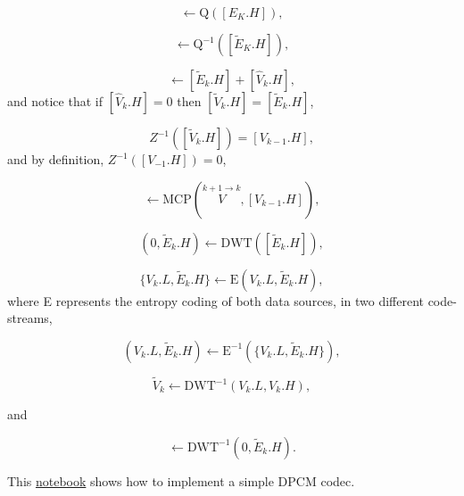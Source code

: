 \begin{equation}
  [\tilde{E}_k.H] \leftarrow \text{Q}([E_K.H]),
  \tag{j}
\end{equation}

\begin{equation}
  [\tilde{E}_k.H] \leftarrow  \text{Q}^{-1}([\tilde{E}_K.H]),
  \tag{k}
\end{equation}

\begin{equation}
  [\tilde{V}_k.H] \leftarrow [\tilde{E}_k.H] + [\hat{V}_k.H],
  \tag{l}
\end{equation}
and notice that if $[\hat{V}_k.H]=0$ then $[\tilde{V}_k.H] =
[\tilde{E}_k.H]$,

\begin{equation}
  Z^{-1}([\tilde{V}_k.H]) = [V_{k-1}.H],
  \tag{m}
\end{equation}
and by definition, $Z^{-1}([V_{-1}.H]) = 0$,

\begin{equation}
  [\hat{V}_k.H] \leftarrow \text{MCP}(\overset{k+1\rightarrow k}{V}, [V_{k-1}.H]),
  \tag{n}
\end{equation}

\begin{equation}
  (0, \tilde{E}_k.H) \leftarrow \text{DWT}([\tilde{E}_k.H]),
  \tag{o}
\end{equation}

\begin{equation}
  \{V_k.L, \tilde{E}_k.H\} \leftarrow \text{E}(V_k.L, \tilde{E}_k.H),
  \tag{p}
\end{equation}
where E represents the entropy coding of both data sources, in two
different code-streams,

\begin{equation}
  (V_k.L, \tilde{E}_k.H) \leftarrow \text{E}^{-1}(\{V_k.L, \tilde{E}_k.H\}),
  \tag{q}
\end{equation}

\begin{equation}
  \tilde{V}_k \leftarrow \text{DWT}^{-1}(V_k.L, V_k.H),
  \tag{r}
\end{equation}

and

\begin{equation}
  [\tilde{E}_k.H] \leftarrow \text{DWT}^{-1}(0, \tilde{E}_k.H).
  \tag{s}
\end{equation}

This
\href{https://github.com/Sistemas-Multimedia/Sistemas-Multimedia.github.io/blob/master/milestones/12-IPP_coding/DPCM.ipynb}{notebook}
shows how to implement a simple DPCM codec.

